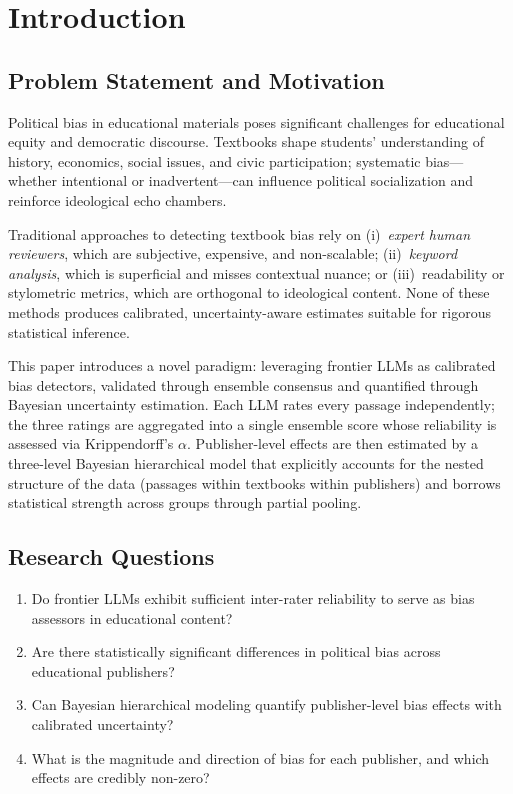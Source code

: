 \documentclass[10pt,letterpaper]{article}
\begin{document}
\section{Introduction}
\label{sec:introduction}

\subsection{Problem Statement and Motivation}

Political bias in educational materials poses significant challenges for
educational equity and democratic discourse.  Textbooks shape students'
understanding of history, economics, social issues, and civic participation;
systematic bias---whether intentional or inadvertent---can influence political
socialization and reinforce ideological echo chambers.

Traditional approaches to detecting textbook bias rely on (i)~\emph{expert human
reviewers}, which are subjective, expensive, and non-scalable; (ii)~\emph{keyword
analysis}, which is superficial and misses contextual nuance; or (iii)~readability
or stylometric metrics, which are orthogonal to ideological content.  None of
these methods produces calibrated, uncertainty-aware estimates suitable for
rigorous statistical inference.

This paper introduces a novel paradigm: leveraging frontier LLMs as calibrated
bias detectors, validated through ensemble consensus and quantified through
Bayesian uncertainty estimation.  Each LLM rates every passage independently;
the three ratings are aggregated into a single ensemble score whose reliability
is assessed via Krippendorff's $\alpha$.  Publisher-level effects are then
estimated by a three-level Bayesian hierarchical model that explicitly accounts
for the nested structure of the data (passages within textbooks within
publishers) and borrows statistical strength across groups through partial pooling.

\subsection{Research Questions}

\begin{enumerate}
  \item[\textbf{RQ1}] Do frontier LLMs exhibit sufficient inter-rater reliability
        to serve as bias assessors in educational content?
  \item[\textbf{RQ2}] Are there statistically significant differences in political
        bias across educational publishers?
  \item[\textbf{RQ3}] Can Bayesian hierarchical modeling quantify publisher-level
        bias effects with calibrated uncertainty?
  \item[\textbf{RQ4}] What is the magnitude and direction of bias for each
        publisher, and which effects are credibly non-zero?
\end{enumerate}
\end{document}
